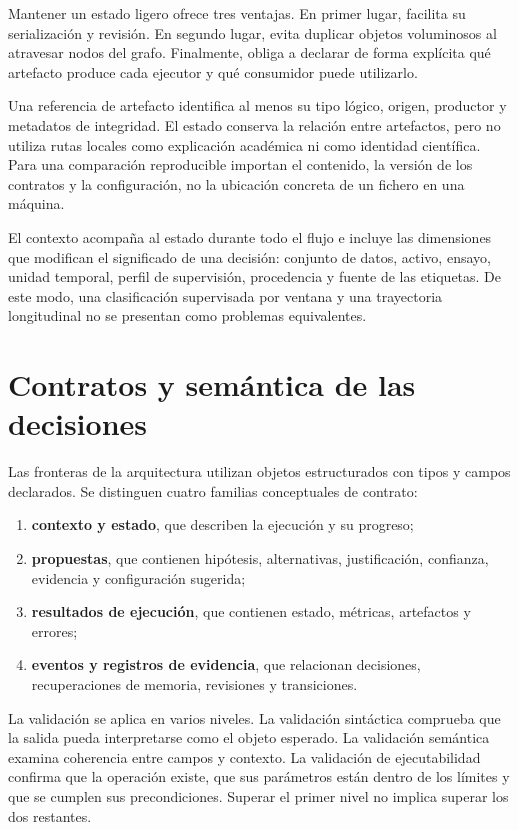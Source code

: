 Mantener un estado ligero ofrece tres ventajas. En primer lugar, facilita su
serialización y revisión. En segundo lugar, evita duplicar objetos voluminosos
al atravesar nodos del grafo. Finalmente, obliga a declarar de forma explícita
qué artefacto produce cada ejecutor y qué consumidor puede utilizarlo.

Una referencia de artefacto identifica al menos su tipo lógico, origen,
productor y metadatos de integridad. El estado conserva la relación entre
artefactos, pero no utiliza rutas locales como explicación académica ni como
identidad científica. Para una comparación reproducible importan el contenido,
la versión de los contratos y la configuración, no la ubicación concreta de
un fichero en una máquina.

El contexto acompaña al estado durante todo el flujo e incluye las dimensiones
que modifican el significado de una decisión: conjunto de datos, activo,
ensayo, unidad temporal, perfil de supervisión, procedencia y fuente de las
etiquetas. De este modo, una clasificación supervisada por ventana y una
trayectoria longitudinal no se presentan como problemas equivalentes.

\section{Contratos y semántica de las decisiones}

Las fronteras de la arquitectura utilizan objetos estructurados con tipos y
campos declarados. Se distinguen cuatro familias conceptuales de contrato:

\begin{enumerate}
  \item \textbf{contexto y estado}, que describen la ejecución y su progreso;
  \item \textbf{propuestas}, que contienen hipótesis, alternativas,
        justificación, confianza, evidencia y configuración sugerida;
  \item \textbf{resultados de ejecución}, que contienen estado, métricas,
        artefactos y errores;
  \item \textbf{eventos y registros de evidencia}, que relacionan decisiones,
        recuperaciones de memoria, revisiones y transiciones.
\end{enumerate}

La validación se aplica en varios niveles. La validación sintáctica comprueba
que la salida pueda interpretarse como el objeto esperado. La validación
semántica examina coherencia entre campos y contexto. La validación de
ejecutabilidad confirma que la operación existe, que sus parámetros están
dentro de los límites y que se cumplen sus precondiciones. Superar el primer
nivel no implica superar los dos restantes.

